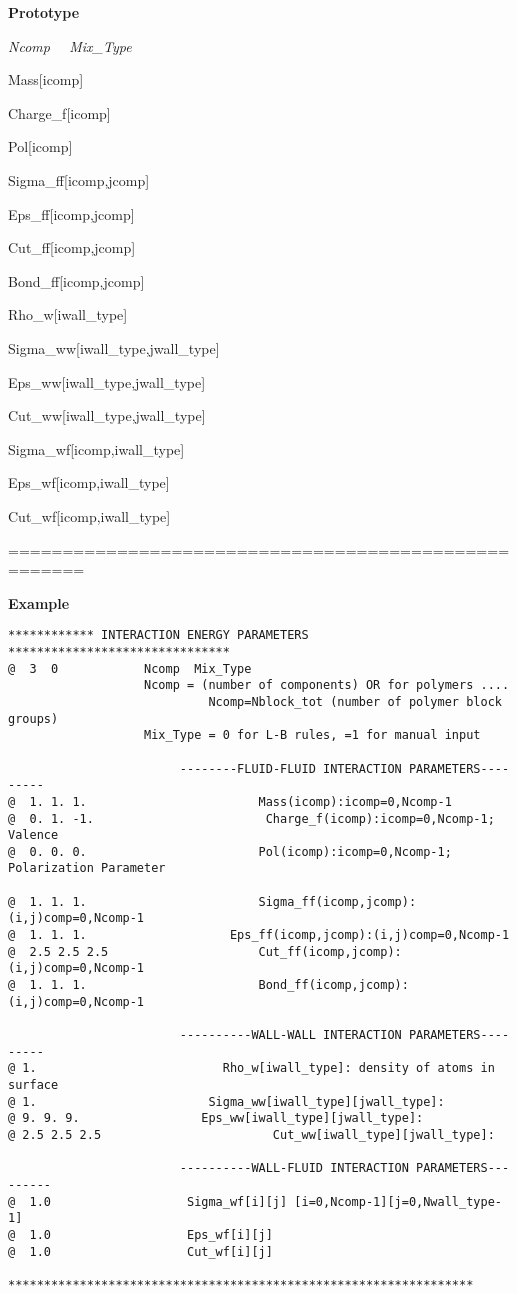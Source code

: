 \documentclass[10pt,onecolumn]{article}
\begin{document}
{\bf Prototype}

{\it Ncomp  \ \ Mix\_Type

Mass[icomp]

Charge\_f[icomp]

Pol[icomp]

Sigma\_ff[icomp,jcomp]

Eps\_ff[icomp,jcomp]

Cut\_ff[icomp,jcomp]

Bond\_ff[icomp,jcomp]

Rho\_w[iwall\_type]

Sigma\_ww[iwall\_type,jwall\_type]

Eps\_ww[iwall\_type,jwall\_type]

Cut\_ww[iwall\_type,jwall\_type]

Sigma\_wf[icomp,iwall\_type]

Eps\_wf[icomp,iwall\_type]

Cut\_wf[icomp,iwall\_type]

}

\noindent=====================================================

{\bf Example}

\begin{verbatim}
************ INTERACTION ENERGY PARAMETERS *******************************
@  3  0            Ncomp  Mix_Type
                   Ncomp = (number of components) OR for polymers ....
                            Ncomp=Nblock_tot (number of polymer block groups)
                   Mix_Type = 0 for L-B rules, =1 for manual input

                        --------FLUID-FLUID INTERACTION PARAMETERS---------
@  1. 1. 1.                        Mass(icomp):icomp=0,Ncomp-1
@  0. 1. -1.                        Charge_f(icomp):icomp=0,Ncomp-1; Valence
@  0. 0. 0.                        Pol(icomp):icomp=0,Ncomp-1; Polarization Parameter

@  1. 1. 1.                        Sigma_ff(icomp,jcomp):(i,j)comp=0,Ncomp-1
@  1. 1. 1.                    Eps_ff(icomp,jcomp):(i,j)comp=0,Ncomp-1
@  2.5 2.5 2.5                     Cut_ff(icomp,jcomp):(i,j)comp=0,Ncomp-1
@  1. 1. 1.                        Bond_ff(icomp,jcomp):(i,j)comp=0,Ncomp-1

                        ----------WALL-WALL INTERACTION PARAMETERS---------
@ 1.                          Rho_w[iwall_type]: density of atoms in surface
@ 1.                        Sigma_ww[iwall_type][jwall_type]:
@ 9. 9. 9.                 Eps_ww[iwall_type][jwall_type]:
@ 2.5 2.5 2.5                        Cut_ww[iwall_type][jwall_type]:

                        ----------WALL-FLUID INTERACTION PARAMETERS---------
@  1.0                   Sigma_wf[i][j] [i=0,Ncomp-1][j=0,Nwall_type-1]
@  1.0                   Eps_wf[i][j]
@  1.0                   Cut_wf[i][j]

*****************************************************************
\end{verbatim}
\end{document}
